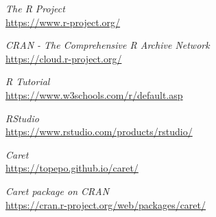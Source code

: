 \begin{thebibliography}{100}

	\emph{The R Project}\\
	\url{https://www.r-project.org/}

	\emph{CRAN - The Comprehensive R Archive Network}\\
	\url{https://cloud.r-project.org/}

	\textit{R Tutorial}\\
	\url{https://www.w3schools.com/r/default.asp}

	\textit{RStudio}\\
	\url{https://www.rstudio.com/products/rstudio/}

	\emph{Caret}\\
	\url{https://topepo.github.io/caret/}

	\emph{Caret package on CRAN}\\
	\url{https://cran.r-project.org/web/packages/caret/}
\end{thebibliography}
